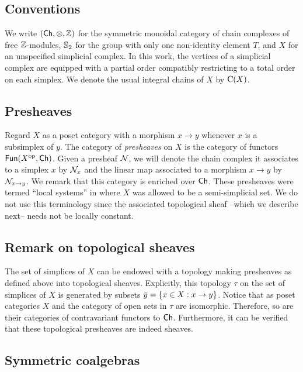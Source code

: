
\subsection{Conventions}

We write $(\mathsf{Ch}, \otimes, \mathbb{Z})$ for the symmetric monoidal category of chain complexes of free $\mathbb{Z}$-modules, $\mathbb{S}_2$ for the group with only one non-identity element $T$, and $X$ for an unspecified simplicial complex.
In this work, the vertices of a simplicial complex are equipped with a partial order compatibly restricting to a total order on each simplex.
We denote the usual integral chains of $X$ by $\operatorname{C}(X)$.

\subsection{Presheaves} \label{ss:presheaves}

Regard $X$ as a poset category with a morphism $x \to y$ whenever $x$ is a subsimplex of $y$.
The category of \textit{presheaves} on $X$ is the category of functors $\mathsf{Fun}(X^{\mathrm{op}}, \mathsf{Ch})$.
Given a presheaf $\mathcal{N}$, we will denote the chain complex it associates to a simplex $x$ by $\mathcal{N}_x$ and the linear map associated to a morphism $x \to y$ by $\mathcal{N}_{x \to y}$.
We remark that this category is enriched over $\mathsf{Ch}$.
These presheaves were termed ``local systems'' in \cite{ranicki1990assembly} where $X$ was allowed to be a semi-simplicial set.
We do not use this terminology since the associated topological sheaf --which we describe next-- needs not be locally constant.

\subsection{Remark on topological sheaves} \label{ss:topological sheaf}

The set of simplices of $X$ can be endowed with a topology making presheaves as defined above into topological sheaves.
Explicitly, this topology $\tau$ on the set of simplices of $X$ is generated by subsets $\bar y = \{x \in X : x \to y\}$.
Notice that as poset categories $X$ and the category of open sets in $\tau$ are isomorphic.
Therefore, so are their categories of contravariant functors to $\mathsf{Ch}$.
Furthermore, it can be verified that these topological presheaves are indeed sheaves.

\subsection{Symmetric coalgebras}

